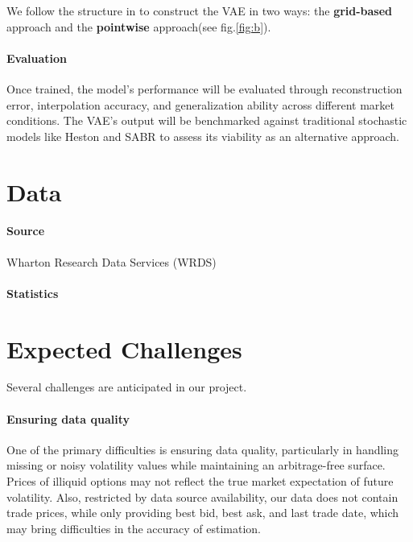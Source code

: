 \documentclass{article}
\newcommand{\todo}[1]{\fbox{\textcolor{red}{\bfseries #1} }}%
\begin{document}
We follow the structure in \cite{vaeorigin} to construct the VAE in two ways: the \textbf{grid-based} approach and the \textbf{pointwise} approach(see fig.\ref{fig:b}).


\paragraph{Evaluation} Once trained, the model’s performance will be evaluated through reconstruction error, interpolation accuracy, and generalization ability across different market conditions. The VAE’s output will be benchmarked against traditional stochastic models like Heston \cite{wolfram_volsurface_heston} and SABR \cite{wolfram_volsurface_sabr} to assess its viability as an alternative approach.

\section{Data}
\paragraph{Source} Wharton Research Data Services (WRDS) \todo{Detailed description}
\paragraph{Statistics}  \todo{Add statistics here}




\section{Expected Challenges}

Several challenges are anticipated in our project.
\paragraph{Ensuring data quality}
One of the primary difficulties is ensuring data quality, particularly in handling missing or noisy volatility values while maintaining an arbitrage-free surface. Prices of illiquid options may not reflect the true market expectation of future volatility. Also, restricted by data source availability, our data does not contain trade prices, while only providing best bid, best ask, and last trade date, which may bring difficulties in the accuracy of estimation.
\end{document}
